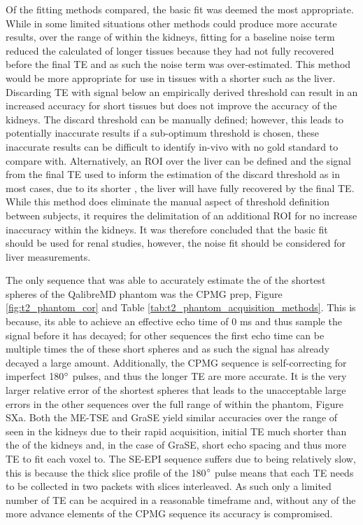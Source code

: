 Of the fitting methods compared, the basic fit was deemed the most appropriate. While in some limited situations other methods could produce more accurate results, over the range of \ttwo within the kidneys, fitting for a baseline noise term reduced the calculated \ttwo of longer \ttwo tissues because they had not fully recovered before the final \ac{TE} and as such the noise term was over-estimated. This method would be more appropriate for use in tissues with a shorter \ttwo such as the liver. Discarding \ac{TE} with signal below an empirically derived threshold can result in an increased accuracy for short \ttwo tissues but does not improve the accuracy of the kidneys. The discard threshold can be manually defined; however, this leads to potentially inaccurate results if a sub-optimum threshold is chosen, these inaccurate results can be difficult to identify in-vivo with no gold standard to compare with. Alternatively, an \ac{ROI} over the liver can be defined and the signal from the final \ac{TE} used to inform the estimation of the discard threshold as in most cases, due to its shorter \ttwo, the liver will have fully recovered by the final \ac{TE}. While this method does eliminate the manual aspect of threshold definition between subjects, it requires the delimitation of an additional \ac{ROI} for no increase inaccuracy within the kidneys. It was therefore concluded that the basic fit should be used for renal studies, however, the noise fit should be considered for liver \ttwo measurements.

The only sequence that was able to accurately estimate the \ttwo of the shortest \ttwo spheres of the QalibreMD phantom was the \ac{CPMG} \ttwo prep, Figure \ref{fig:t2_phantom_cor} and Table \ref{tab:t2_phantom_acquisition_methods}. This is because, its able to achieve an effective echo time of 0 ms and thus sample the signal before it has decayed; for other sequences the first echo time can be multiple times the \ttwo of these short spheres and as such the signal has already decayed a large amount. Additionally, the \ac{CPMG} sequence is self-correcting for imperfect 180$\degree$ pulses, and thus the longer \ac{TE} are more accurate. It is the very larger relative error of the shortest \ttwo spheres that leads to the unacceptable large errors in the other sequences over the full range of \ttwo within the phantom, Figure SXa. Both the \ac{ME-TSE} and \ac{GraSE} yield similar accuracies over the range of \ttwo seen in the kidneys due to their rapid acquisition, initial \ac{TE} much shorter than the \ttwo of the kidneys and, in the case of \ac{GraSE}, short echo spacing  and thus more \ac{TE} to fit each voxel to. The \ac{SE}-\ac{EPI} sequence suffers due to being relatively slow, this is because the thick slice profile of the 180$\degree$ pulse means that each \ac{TE} needs to be collected in two packets with slices interleaved. As such only a limited number of \ac{TE} can be acquired in a reasonable timeframe and, without any of the more advance elements of the \ac{CPMG} sequence its accuracy is compromised. 

